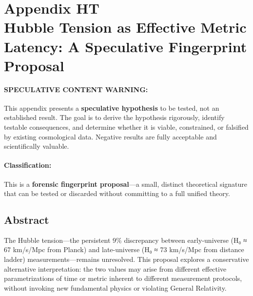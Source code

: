 %


\section*{Appendix HT \\ Hubble Tension as Effective Metric Latency: A Speculative Fingerprint Proposal}

\paragraph{SPECULATIVE CONTENT WARNING:}
This appendix presents a \textbf{speculative hypothesis} to be tested, not an established result. The goal is to derive the hypothesis rigorously, identify testable consequences, and determine whether it is viable, constrained, or falsified by existing cosmological data. Negative results are fully acceptable and scientifically valuable.

\paragraph{Classification:} This is a \textbf{forensic fingerprint proposal}—a small, distinct theoretical signature that can be tested or discarded without committing to a full unified theory.

\subsection{Abstract}

The Hubble tension—the persistent 9\% discrepancy between early-universe (H₀ ≈ 67 km/s/Mpc from Planck) and late-universe (H₀ ≈ 73 km/s/Mpc from distance ladder) measurements—remains unresolved. This proposal explores a conservative alternative interpretation: the two values may arise from different effective parametrizations of time or metric inherent to different measurement protocols, without invoking new fundamental physics or violating General Relativity.


